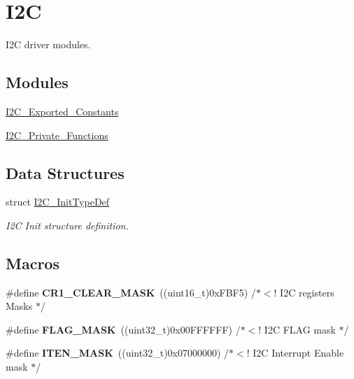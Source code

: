\hypertarget{group___i2_c}{\section{I2\-C}
\label{group___i2_c}
}


I2\-C driver modules.  


\subsection*{Modules}
\begin{DoxyCompactItemize}
\item 
\hyperlink{group___i2_c___exported___constants}{I2\-C\-\_\-\-Exported\-\_\-\-Constants}
\item 
\hyperlink{group___i2_c___private___functions}{I2\-C\-\_\-\-Private\-\_\-\-Functions}
\end{DoxyCompactItemize}
\subsection*{Data Structures}
\begin{DoxyCompactItemize}
\item 
struct \hyperlink{struct_i2_c___init_type_def}{I2\-C\-\_\-\-Init\-Type\-Def}
\begin{DoxyCompactList}\small\item\em I2\-C Init structure definition. \end{DoxyCompactList}\end{DoxyCompactItemize}
\subsection*{Macros}
\begin{DoxyCompactItemize}
\item 
\hypertarget{group___i2_c_ga8d425258898b4af4ebc820f52635fad8}{\#define {\bfseries C\-R1\-\_\-\-C\-L\-E\-A\-R\-\_\-\-M\-A\-S\-K}~((uint16\-\_\-t)0x\-F\-B\-F5)      /$\ast$$<$! I2\-C registers Masks $\ast$/}\label{group___i2_c_ga8d425258898b4af4ebc820f52635fad8}

\item 
\hypertarget{group___i2_c_ga890221cb651a3f30f6d1bca0d9b0e13d}{\#define {\bfseries F\-L\-A\-G\-\_\-\-M\-A\-S\-K}~((uint32\-\_\-t)0x00\-F\-F\-F\-F\-F\-F)  /$\ast$$<$! I2\-C F\-L\-A\-G mask $\ast$/}\label{group___i2_c_ga890221cb651a3f30f6d1bca0d9b0e13d}

\item 
\hypertarget{group___i2_c_ga0befa8c9e0cb00ab52bd8a8d68718706}{\#define {\bfseries I\-T\-E\-N\-\_\-\-M\-A\-S\-K}~((uint32\-\_\-t)0x07000000)  /$\ast$$<$! I2\-C Interrupt Enable mask $\ast$/}\label{group___i2_c_ga0befa8c9e0cb00ab52bd8a8d68718706}

\end{DoxyCompactItemize}
